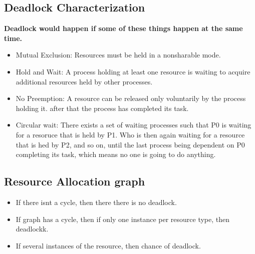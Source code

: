 \documentclass[11pt]{article}
\begin{document}
\subsection{Deadlock Characterization}
\textbf{Deadlock would happen if some of these things happen at the same time. }
\begin{itemize}
	\item Mutual Exclusion: Resources must be held in a nonsharable mode. 
	\item Hold and Wait: A process holding at least one resource is waiting to acquire additional resources held by other processes. 
	\item No Preemption: A resource can be released only voluntarily by the process holding it. after that the process has completed its task. 
	\item Circular wait: There exists a set of waiting processes such that P0 is waiting for a resoruce that is held by P1. Who is then again waiting for a resource that is hed by P2, and so on, until the last process being dependent on P0 completing its task, which means no one is going to do anything. 
\end{itemize}

\subsection{Resource Allocation graph}
\begin{itemize}
	\item If there isnt a cycle, then there there is no deadlock. 
	\item If graph has a cycle, then if only one instance per resource type, then deadlockk. 
	\item If several instances of the resource, then chance of deadlock. 
\end{itemize}
\end{document}
